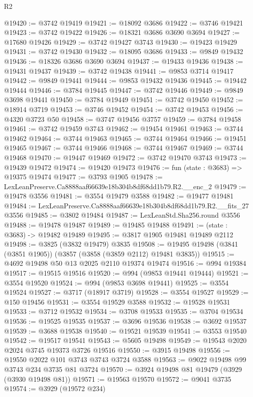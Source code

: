 \begin{lexlean}{R2}
\begin{coremodule}
@19420 := @3742 @19419
@19421 := @18092 @3686
@19422 := @3746 @19421
@19423 := @3742 @19422
@19426 := @18321 @3686 @3690 @3694
@19427 := @17680 @19426
@19429 := @3742 @19427 @3743
@19430 := @19423 @19429
@19431 := @3742 @19430
@19432 := @18095 @3686
@19433 := @9849 @19432
@19436 := @18326 @3686 @3690 @3694
@19437 := @19433 @19436
@19438 := @19431 @19437
@19439 := @3742 @19438
@19441 := @9853 @3714 @19417
@19442 := @9849 @19441
@19444 := @9853 @19432 @19436
@19445 := @19442 @19444
@19446 := @3784 @19445
@19447 := @3742 @19446
@19449 := @9849 @3698 @19441
@19450 := @3784 @19449
@19451 := @3742 @19450
@19452 := @18914 @3719
@19453 := @3746 @19452
@19454 := @3742 @19453
@19456 := @4320 @3723 @50
@19458 := @3747 @19456 @3757
@19459 := @3784 @19458
@19461 := @3742 @19459 @3743
@19462 := @19454 @19461
@19463 := @3744 @19462
@19464 := @3744 @19463
@19465 := @3744 @19464
@19466 := @19451 @19465
@19467 := @3744 @19466
@19468 := @3744 @19467
@19469 := @3744 @19468
@19470 := @19447 @19469
@19472 := @3742 @19470 @3743
@19473 := @19439 @19472
@19474 := @19420 @19473
@19476 := fun (state : @3683) => @19375 @19474
@19477 := @3793 @1905
@19478 := LexLeanPreserve.Ca8888aaf66639e18b304b8df68dd1b79.R2.__enc_2
@19479 := @19478 @3556
@19481 := @3554 @19479 @3588
@19482 := @19477 @19481
@19484 := LexLeanPreserve.Ca8888aaf66639e18b304b8df68dd1b79.R2.__fits_27 @3556
@19485 := @3802 @19484
@19487 := LexLeanStd.Sha256.round @3556
@19488 := @19478 @19487
@19489 := @19485 @19488
@19491 := (state : @3683) -> @19482 @19489
@19495 := @3817 @1905 @19481 @19489 @2112
@19498 := @3825 (@3832 @19479) @3835
@19508 := @19495 @19498 (@3841 (@3851 @1905)) (@3857 (@3858 (@3859 @2112) @19481 @3835))
@19515 := @4692 @19498 @50 @13 @2025 @2110 @19374 @19474
@19516 := @994 @19384
@19517 := @19515 @19516
@19520 := @994 (@9853 @19441 @19444)
@19521 := @3554 @19520
@19524 := @994 (@9853 @3698 @19441)
@19525 := @3554 @19524
@19527 := @3717 (@18917 @3719)
@19528 := @3554 @19527
@19529 := @150 @19456
@19531 := @3554 @19529 @3588
@19532 := @19528 @19531
@19533 := @3712 @19532
@19534 := @3708 @19533
@19535 := @3704 @19534
@19536 := @19525 @19535
@19537 := @3696 @19536
@19538 := @3692 @19537
@19539 := @3688 @19538
@19540 := @19521 @19539
@19541 := @3553 @19540
@19542 := @19517 @19541
@19543 := @5605 @19498
@19549 := @19543 @2020 @2024 @3745 @19373 @3726 @19516
@19550 := @3915 @19498
@19556 := @19550 @2022 @101 @3743 @3743 @3724 @3588
@19563 := @9022 @19498 @99 @3743 @234 @3735 @81 @3724
@19570 := @3924 @19498 @81 @19479 (@3929 (@3930 @19498 @81))
@19571 := @19563 @19570
@19572 := @9041 @3735
@19574 := @3929 (@19572 @234)

\end{coremodule}
\end{lexlean}
